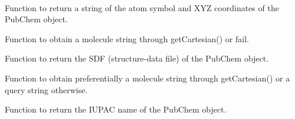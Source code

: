 \documentclass[letterpaper,10pt,english]{sphinxmanual}
\begin{document}
\begin{fulllineitems}
\label{index:pubchem.PubChemObj}~

\begin{fulllineitems}
\label{index:pubchem.PubChemObj.getCartesian}
Function to return a string of the atom symbol and XYZ
coordinates of the PubChem object.

\end{fulllineitems}


\begin{fulllineitems}
\label{index:pubchem.PubChemObj.getMoleculeString}
Function to obtain a molecule string through
getCartesian() or fail.

\end{fulllineitems}


\begin{fulllineitems}
\label{index:pubchem.PubChemObj.getSDF}
Function to return the SDF (structure-data file) of the PubChem object.

\end{fulllineitems}


\begin{fulllineitems}
\label{index:pubchem.PubChemObj.getXYZFile}
Function to obtain preferentially a molecule string
through getCartesian() or a query string otherwise.

\end{fulllineitems}


\begin{fulllineitems}
\label{index:pubchem.PubChemObj.name}
Function to return the IUPAC name of the PubChem object.

\end{fulllineitems}


\end{fulllineitems}
\end{document}
